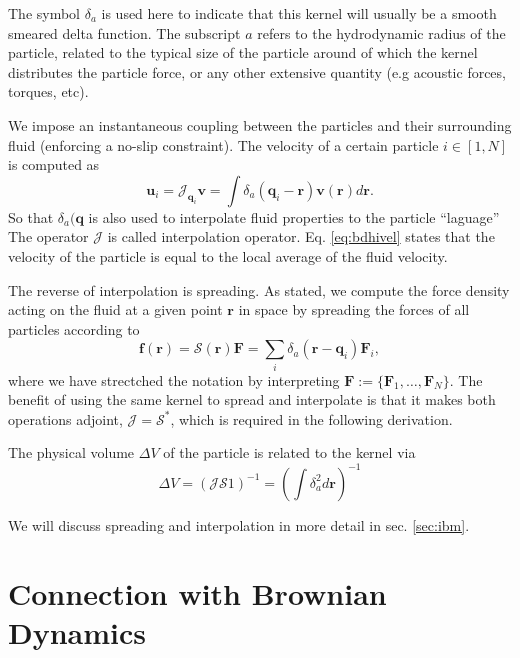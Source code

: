 \documentclass[ twoside,openright,titlepage,numbers=noenddot,%
headinclude,footinclude,cleardoublepage=empty,abstract=on,
BCOR=5mm,paper=a4,fontsize=11pt, dvipsnames
]{scrreprt}
\renewcommand{\vec}[1]{\bm{#1}}
\newcommand{\oper}[1]{\mathcal{#1}}
\newcommand{\ppos}{q}
\newcommand{\pvel}{u}
\newcommand{\fpos}{r}
\newcommand{\fvel}{v}
\begin{document}
The symbol $\delta_a$ is used here to indicate that this kernel will usually be a smooth smeared delta function. The subscript $a$ refers to the hydrodynamic radius of the particle, related to the typical size of the particle around of which the kernel distributes the particle force, or any other extensive quantity (e.g acoustic forces\cite{Balboa2013}, torques, etc).

We impose an instantaneous coupling between the particles and their surrounding fluid (enforcing a no-slip constraint). The velocity of a certain particle $i\in [1,N]$ is computed as
\begin{equation}
  \label{eq:bdhifvel}
  \vec{\pvel}_i= \oper{J}_{\vec{\ppos}_i}\vec{\fvel} =\int{\delta_a(\vec{\ppos}_i - \vec{\fpos})\vec{\fvel}(\vec{\fpos})d\vec{\fpos}}.
\end{equation}
So that $\delta_a(\vec{\ppos}$ is also used  to interpolate fluid properties to the particle ``laguage''
The operator $\oper{J}$ is called interpolation operator. Eq. \eqref{eq:bdhivel} states that the velocity of the particle is equal to the local average of the fluid velocity.

The reverse of interpolation is spreading. As stated, we compute the force density acting on the fluid at a given point $\vec{\fpos}$ in space by spreading the forces of all particles according to
\begin{equation}
  \label{eq:spreadoper}
  \vec{f}(\vec{\fpos}) = \oper{S}(\vec{\fpos})\vec{F} = \sum_i\delta_a(\vec{\fpos}-\vec{\ppos}_i)\vec{F}_i,
\end{equation}
where we have strectched the notation by interpreting $\vec{F} := \{\vec{F}_1,\dots,\vec{F}_N\}$.
The benefit of using the same kernel to spread and interpolate is that it makes both operations adjoint, $\oper{J} = \oper{S}^*$, which is required in the following derivation\cite{Delong2014}.

The physical volume $\Delta V$ of the particle is related to the kernel via
\begin{equation}
  \Delta V = (\oper{J}\oper{S}1)^{-1} = \left(\int\delta_a^2d\vec{r}\right)^{-1}
\end{equation}

We will discuss spreading and interpolation in more detail in sec. \ref{sec:ibm}.

\section{Connection with Brownian Dynamics}\label{sec:bdhicon}
\end{document}
